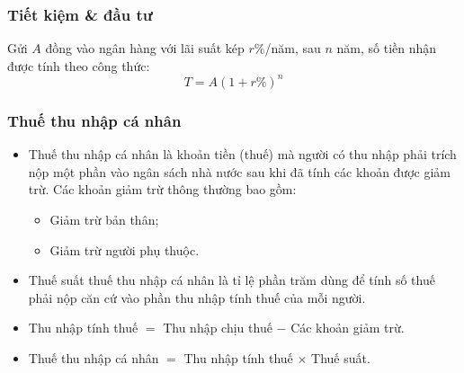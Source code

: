 \subsubsection{Tiết kiệm \& đầu tư}
		Gửi $A$ đồng vào ngân hàng với lãi suất kép $r\%$/năm, sau $n$ năm, số tiền nhận được tính theo công thức:
		$$T = A (1+r\%)^n$$
\subsubsection{Thuế thu nhập cá nhân}
		\begin{itemize}
		\item Thuế thu nhập cá nhân là khoản tiền (thuế) mà người có thu nhập phải trích nộp một phần vào ngân sách nhà nước sau khi đã tính các khoản được giảm trừ. Các khoản giảm trừ thông thường bao gồm:
		\begin{itemize}
		\item Giảm trừ bản thân;
		\item Giảm trừ người phụ thuộc.
		\end{itemize}
		\item Thuế suất thuế thu nhập cá nhân là tỉ lệ phần trăm dùng để tính số thuế phải nộp căn cứ vào phần thu nhập tính thuế của mỗi người.
		\item Thu nhập tính thuế $=$ Thu nhập chịu thuế $-$ Các khoản giảm trừ.
		\item Thuế thu nhập cá nhân $=$ Thu nhập tính thuế $\times$ Thuế suất.
		\end{itemize}
	
